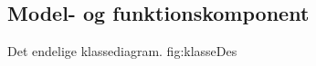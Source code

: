 \subsection{Model- og funktionskomponent}
\label{sec:modelfunktion}
% 

	{Det endelige klassediagram.}
	{fig:klasseDes}
